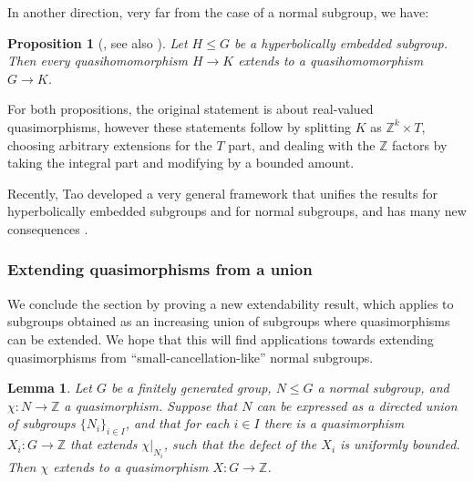 \documentclass[svgnames]{amsart}
\theoremstyle{plain}
\newtheorem{lemma}[thm]{Lemma}
\newtheorem{prop}[thm]{Proposition}
\theoremstyle{definition}
\newcommand{\Z}{\mathbb{Z}}
\begin{document}
In another direction, very far from the case of a normal subgroup, we have:

\begin{prop}[\cite{Hull_Osin}, see also \cite{FPS}]
\label{extending hypemb}
    Let $H \le G$ be a hyperbolically embedded subgroup. Then every quasihomomorphism $H \to K$ extends to a quasihomomorphism $G \to K$.
\end{prop}

For both propositions, the original statement is about real-valued quasimorphisms, however these statements follow by splitting $K$ as $\Z^k \times T$, choosing arbitrary extensions for the $T$ part, and dealing with the $\Z$ factors by taking the integral part and modifying by a bounded amount.

Recently, Tao developed a very general framework that unifies the results for hyperbolically embedded subgroups and for normal subgroups, and has many new consequences \cite{tao2025extensiontheoremquasimorphisms}.


\subsubsection{Extending quasimorphisms from a union}
We conclude the section by proving a new extendability result, which applies to subgroups obtained as an increasing union of subgroups where quasimorphisms can be extended. We hope that this will find applications towards extending quasimorphisms from ``small-cancellation-like'' normal subgroups.

\begin{lemma}\label{lem:extension_from_union}
    Let $G$ be a finitely generated group, $N \le G$ a normal subgroup, and $\chi \colon N \to \mathbb{Z}$ a quasimorphism. Suppose that $N$ can be expressed as a directed union of subgroups $\{ N_i \}_{i \in I}$, and that for each $i \in I$ there is a quasimorphism $X_i \colon G \to \mathbb{Z}$ that extends $\chi|_{N_i}$, such that the defect of the $X_i$ is uniformly bounded. Then $\chi$ extends to a quasimorphism $X \colon G \to \mathbb{Z}$.
\end{lemma}
\end{document}
